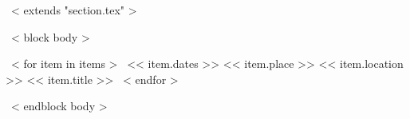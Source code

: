 ~< extends "section.tex" >~

~< block body >~
\begin{entrylistFour}
~< for item in items >~
\entryFour
{<< item.dates >>}
{<< item.place >>}
{<< item.location >>}
{<< item.title >>}
~< endfor >~
\end{entrylistFour}
~< endblock body >~
